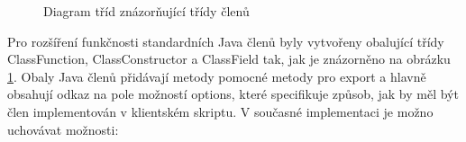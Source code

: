 \begin{figure}[H]
  \begin{center}
    \caption{Diagram tříd znázorňující třídy členů}
    \label{Figure.ClassMember}
  \end{center}
\end{figure}

Pro rozšíření funkčnosti standardních Java členů byly vytvořeny obalující třídy ClassFunction, ClassConstructor a ClassField tak, jak je znázorněno na obrázku \ref{Figure.ClassMember}. Obaly Java členů přidávají metody pomocné metody pro export a hlavně obsahují odkaz na pole možností options, které specifikuje způsob, jak by měl být člen implementován v klientském skriptu. V současné implementaci je možno uchovávat možnosti:

